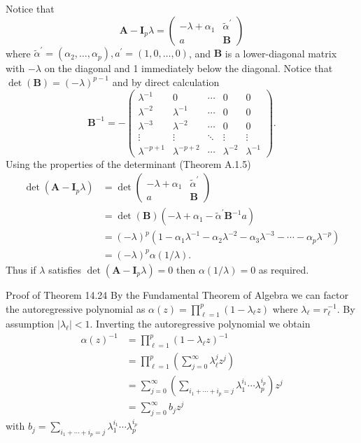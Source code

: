 \documentclass[10pt]{article}
\begin{document}
Notice that
$$
\boldsymbol{A}-\boldsymbol{I}_{p} \lambda=\left(\begin{array}{cc}
-\lambda+\alpha_{1} & \widetilde{\alpha}^{\prime} \\
a & \boldsymbol{B}
\end{array}\right)
$$
where $\widetilde{\alpha}^{\prime}=\left(\alpha_{2}, \ldots, \alpha_{p}\right), a^{\prime}=(1,0, \ldots, 0)$, and $\boldsymbol{B}$ is a lower-diagonal matrix with $-\lambda$ on the diagonal and 1 immediately below the diagonal. Notice that $\operatorname{det}(\boldsymbol{B})=(-\lambda)^{p-1}$ and by direct calculation
$$
\boldsymbol{B}^{-1}=-\left(\begin{array}{ccccc}
\lambda^{-1} & 0 & \cdots & 0 & 0 \\
\lambda^{-2} & \lambda^{-1} & \cdots & 0 & 0 \\
\lambda^{-3} & \lambda^{-2} & \cdots & 0 & 0 \\
\vdots & \vdots & \ddots & \vdots & \vdots \\
\lambda^{-p+1} & \lambda^{-p+2} & \cdots & \lambda^{-2} & \lambda^{-1}
\end{array}\right) .
$$
Using the properties of the determinant (Theorem A.1.5)
$$
\begin{aligned}
\operatorname{det}\left(\boldsymbol{A}-\boldsymbol{I}_{p} \lambda\right) &=\operatorname{det}\left(\begin{array}{cc}
-\lambda+\alpha_{1} & \widetilde{\alpha}^{\prime} \\
a & \boldsymbol{B}
\end{array}\right) \\
&=\operatorname{det}(\boldsymbol{B})\left(-\lambda+\alpha_{1}-\widetilde{\alpha}^{\prime} \boldsymbol{B}^{-1} a\right) \\
&=(-\lambda)^{p}\left(1-\alpha_{1} \lambda^{-1}-\alpha_{2} \lambda^{-2}-\alpha_{3} \lambda^{-3}-\cdots-\alpha_{p} \lambda^{-p}\right) \\
&=(-\lambda)^{p} \alpha(1 / \lambda) .
\end{aligned}
$$
Thus if $\lambda$ satisfies $\operatorname{det}\left(\boldsymbol{A}-\boldsymbol{I}_{p} \lambda\right)=0$ then $\alpha(1 / \lambda)=0$ as required.

Proof of Theorem 14.24 By the Fundamental Theorem of Algebra we can factor the autoregressive polynomial as $\alpha(z)=\prod_{\ell=1}^{p}\left(1-\lambda_{\ell} z\right)$ where $\lambda_{\ell}=r_{\ell}^{-1}$. By assumption $\left|\lambda_{\ell}\right|<1$. Inverting the autoregressive polynomial we obtain
$$
\begin{aligned}
\alpha(z)^{-1} &=\prod_{\ell=1}^{p}\left(1-\lambda_{\ell} z\right)^{-1} \\
&=\prod_{\ell=1}^{p}\left(\sum_{j=0}^{\infty} \lambda_{\ell}^{j} z^{j}\right) \\
&=\sum_{j=0}^{\infty}\left(\sum_{i_{1}+\cdots+i_{p}=j} \lambda_{1}^{i_{1}} \cdots \lambda_{p}^{i_{p}}\right) z^{j} \\
&=\sum_{j=0}^{\infty} b_{j} z^{j}
\end{aligned}
$$
with $b_{j}=\sum_{i_{1}+\cdots+i_{p}=j} \lambda_{1}^{i_{1}} \cdots \lambda_{p}^{i_{p}}$
\end{document}
